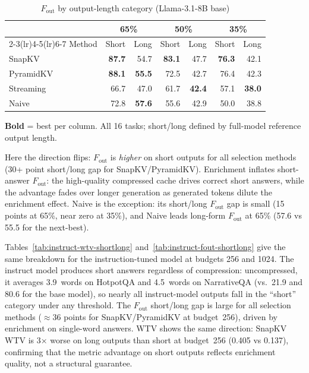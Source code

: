 \documentclass[10pt,letterpaper]{article}
\begin{document}
\begin{table}[H]
\centering
\small
\captionsetup{justification=centering}
\caption{\(F_{\text{out}}\) by output-length category (Llama-3.1-8B base)}
\label{tab:base-fout-shortlong}
\begin{tabular}{@{}lrrrrrr@{}}
\toprule
& \multicolumn{2}{c}{65\%} & \multicolumn{2}{c}{50\%} & \multicolumn{2}{c}{35\%}\\
\cmidrule(lr){2-3}\cmidrule(lr){4-5}\cmidrule(lr){6-7}
Method & Short & Long & Short & Long & Short & Long\\
\midrule
SnapKV    & \textbf{87.7} & 54.7 & \textbf{83.1} & 47.7 & \textbf{76.3} & 42.1\\
PyramidKV & \textbf{88.1} & \textbf{55.5} & 72.5 & 42.7 & 76.4 & 42.3\\
Streaming & 66.7 & 47.0 & 61.7 & \textbf{42.4} & 57.1 & \textbf{38.0}\\
Naive     & 72.8 & \textbf{57.6} & 55.6 & 42.9 & 50.0 & 38.8\\
\bottomrule
\end{tabular}
\center\smallskip
\textbf{Bold} = best per column.
All 16 tasks; short/long defined by full-model reference output length.
\end{table}

Here the direction flips: \(F_{\text{out}}\) is \emph{higher} on short outputs for
all selection methods (30+ point short/long gap for SnapKV/PyramidKV). Enrichment
inflates short-answer \(F_{\text{out}}\): the high-quality compressed cache drives
correct short answers, while the advantage fades over longer generation as
generated tokens dilute the enrichment effect.
Naive is the exception: its short/long \(F_{\text{out}}\) gap is small
(15 points at 65\%, near zero at 35\%), and Naive leads long-form
\(F_{\text{out}}\) at 65\% (57.6 vs 55.5 for the next-best).

Tables~\ref{tab:instruct-wtv-shortlong} and~\ref{tab:instruct-fout-shortlong}
give the same breakdown for the instruction-tuned model at budgets 256 and 1024.
The instruct model produces short answers regardless of compression: uncompressed,
it averages 3.9~words on HotpotQA and 4.5~words on NarrativeQA (vs.\ 21.9
and 80.6 for the base model), so nearly all instruct-model outputs fall in
the ``short'' category under any threshold. The \(F_{\text{out}}\) short/long gap
is large for all selection methods ($\approx$36 points for SnapKV/PyramidKV
at budget~256), driven by enrichment on single-word answers.
WTV shows the same direction: SnapKV WTV is 3× worse on long outputs than short
at budget~256 (0.405 vs 0.137), confirming that the metric advantage on short
outputs reflects enrichment quality, not a structural guarantee.
\end{document}

